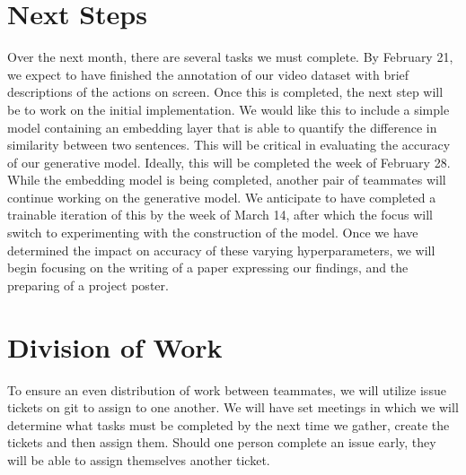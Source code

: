 \documentclass[10pt]{article}
\begin{document}
\section{Next Steps}
Over the next month, there are several tasks we must complete. By February 21, we expect to have finished the annotation of our video
dataset with brief descriptions of the actions on screen. Once this is completed, the next step will be to work on the initial implementation.
We would like this to include a simple model containing an embedding layer that is able to quantify the difference in similarity between
two sentences. This will be critical in evaluating the accuracy of our generative model. Ideally, this will be completed the week of February 28.
While the embedding model is being completed, another pair of teammates will continue working on the generative model. We anticipate to have completed
a trainable iteration of this by the week of March 14, after which the focus will switch to experimenting with the construction of the model. Once we
have determined the impact on accuracy of these varying hyperparameters, we will begin focusing on the writing of a paper expressing our findings, and the
preparing of a project poster.

\section{Division of Work}
To ensure an even distribution of work between teammates, we will utilize issue tickets on git to assign to one another. We will have set meetings in which
we will determine what tasks must be completed by the next time we gather, create the tickets and then assign them. Should one person complete an issue early,
they will be able to assign themselves another ticket.


\end{document}
